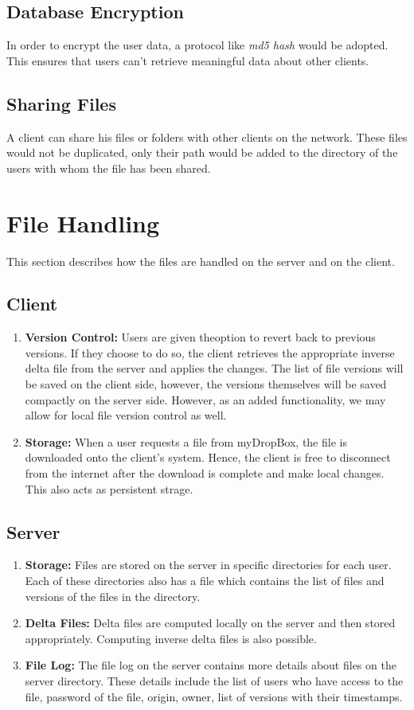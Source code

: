 \documentclass[]{article}
\begin{document}
\subsection{Database Encryption}
In order to encrypt the user data, a protocol like \textit{md5 hash} would be adopted. This ensures that users can't retrieve meaningful data about other clients.

\subsection{Sharing Files}
A client can share his files or folders with other clients on the network. These files would not be duplicated, only their path would be added to the directory of the users with whom the file has been shared.  


\section{\Large File Handling}
This section describes how the files are handled on the server and on the client.
\subsection{\textbf{Client}}
	\begin{enumerate}
	\item \textbf{Version Control:} 
	Users are given theoption to revert back to previous versions. If they choose to do so, the client retrieves the appropriate inverse delta file from the server and applies the changes. The list of file versions will be saved on the client side, however, the versions themselves will be saved compactly on the server side. However, as an added functionality, we may allow for local file version control as well. 
	\item \textbf{Storage:}
	When a user requests a file from myDropBox, the file is downloaded onto the client's system. Hence, the client is free to disconnect from the internet after the download is complete and make local changes. This also acts as persistent strage.
	\end{enumerate}
\subsection{\textbf{Server}} 
\begin{enumerate}
\item \textbf{Storage:}
Files are stored on the server in specific directories for each user. Each of these directories also has a file which contains the list of files and versions of the files in the directory. 
\item \textbf{Delta Files:}
Delta files are computed locally on the server and then stored appropriately. Computing inverse delta files is also possible.
\item \textbf{File Log:}
The file log on the server contains more details about files on the server directory. These details include the list of users who have access to the file, password of the file, origin, owner, list of versions with their timestamps.
\end{enumerate}
\end{document}
